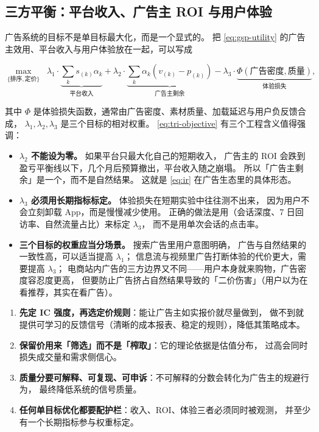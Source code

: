\subsection{三方平衡：平台收入、广告主 ROI 与用户体验}

广告系统的目标不是单目标最大化，而是一个显式的。
把 \cref{eq:gsp-utility} 的广告主效用、平台收入与用户体验放在一起，可以写成

\begin{equation}
\max_{\{\text{排序}, \text{定价}\}} \;\;
\lambda_1 \cdot \underbrace{\sum_k s_{(k)} \alpha_k}_{\text{平台收入}}
+ \lambda_2 \cdot \underbrace{\sum_k \alpha_k (v_{(k)} - p_{(k)})}_{\text{广告主剩余}}
- \lambda_3 \cdot \underbrace{\Phi(\text{广告密度}, \text{质量})}_{\text{体验损失}} ,
\label{eq:tri-objective}
\end{equation}

其中 $\Phi$ 是体验损失函数，通常由广告密度、素材质量、加载延迟与用户负反馈合成，
$\lambda_1, \lambda_2, \lambda_3$ 是三个目标的相对权重。
\cref{eq:tri-objective} 有三个工程含义值得强调：

\begin{itemize}
  \item \textbf{$\lambda_2$ 不能设为零。} 如果平台只最大化自己的短期收入，
        广告主的 ROI 会跌到盈亏平衡线以下，几个月后预算撤出，平台收入随之崩塌。
        所以「广告主剩余」是一个，而不是自然结果。
        这就是 \cref{eq:ir} 在广告生态里的具体形态。
  \item \textbf{$\lambda_3$ 必须用长期指标标定。} 体验损失在短期实验中往往测不出来，
        因为用户不会立刻卸载 App，而是慢慢减少使用。
        正确的做法是用（会话深度、7 日回访率、自然流量占比）来标定 $\lambda_3$，
        而不是用单次会话的点击率。
  \item \textbf{三个目标的权重应当分场景。} 搜索广告里用户意图明确，
        广告与自然结果的一致性高，可以适当提高 $\lambda_1$；
        信息流与视频里广告打断体验的代价更大，需要提高 $\lambda_3$；
        电商站内广告的三方边界又不同——用户本身就来购物，广告密度容忍度更高，
        但要防止广告挤占自然结果导致的「二价伤害」（用户以为在看推荐，其实在看广告）。
\end{itemize}

\begin{keypoint}[机制设计的四条实操准则]
\begin{enumerate}
  \item \textbf{先定 IC 强度，再选定价规则}：能让广告主如实报价就尽量做到，
        做不到就提供可学习的反馈信号（清晰的成本报表、稳定的规则），降低其策略成本。
  \item \textbf{保留价用来「筛选」而不是「榨取」}：它的理论依据是估值分布，
        过高会同时损失成交量和需求侧信心。
  \item \textbf{质量分要可解释、可复现、可申诉}：不可解释的分数会转化为广告主的规避行为，
        最终降低系统的信号质量。
  \item \textbf{任何单目标优化都要配护栏}：收入、ROI、体验三者必须同时被观测，
        并至少有一个长期指标参与权重标定。
\end{enumerate}
\end{keypoint}

